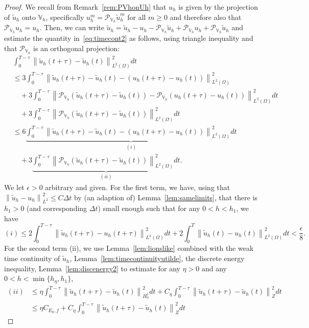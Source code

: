 \documentclass[10pt,letterpaper]{amsart}
\newcommand{\tu}{\widetilde{u}}
\newcommand\norm[1]{\left\lVert#1\right\rVert}
\newcommand{\dom}{\Omega}
\newcommand{\Vh}{\mathbb{V}_h}
\newcommand{\PVh}{\mathcal{P}_{\Vh}}
\theoremstyle{definition}{\newtheorem{definition}[lemma]{Definition}}
\numberwithin{equation}{section}
\begin{document}
\begin{proof}
	We recall from Remark~\ref{rem:PVhonUh} that ${u}_h$ is given by the projection of $\tu_h$ onto $\Vh$, specifically ${u}_h^m = \PVh \tu_h^m$ for all $m\geq 0$ and therefore also that $\PVh u_h = u_h$. Then, we can write $\tu_h = \tu_h-u_h-\PVh \tu_h +\PVh u_h + \PVh \tu_h$ and estimate the quantity in~\eqref{eq:timecont2} as follows, using triangle inequality and that $\PVh$ is an orthogonal projection:
	\begin{align*}
	&\int_0^{T-\tau}\norm{\tu_h(t+\tau)-\tu_h(t)}_{L^2(\dom)}^2 dt\\
	& \leq 3\int_0^{T-\tau}\norm{\tu_h(t+\tau)-\tu_h(t)-(u_h(t+\tau)-u_h(t))}_{L^2(\dom)}^2\\
	&\quad  + 3\int_0^{T-\tau}\norm{\PVh( \tu_h(t+\tau)-\tu_h(t))-\PVh( u_h(t+\tau)-  u_h(t))}_{L^2(\dom)}^2dt \\
	&\quad +3\int_0^{T-\tau}\norm{\PVh( \tu_h(t+\tau)- \tu_h(t))}_{L^2(\dom)}^2 dt\\
	& \leq 6	\underbrace{\int_0^{T-\tau}\norm{\tu_h(t+\tau)-\tu_h(t) - ({u}_h(t+\tau)-{u}_h(t))}_{L^2(\dom)}^2 dt}_{(i)} \\
	&\quad +  3\underbrace{\int_0^{T-\tau}\norm{ \PVh({\tu}_h(t+\tau)- {\tu}_h(t))}_{L^2(\dom)}^2 dt}_{(ii)}.
	\end{align*}
	We let $\epsilon>0$ arbitrary and given. For the first term, we have, using that $\norm{\tu_h-{u}_h}_{L^2}^2\leq C \Delta t$  by (an adaption of) Lemma~\ref{lem:samelimits}, that there is $h_1>0$ (and corresponding $\Delta t $) small enough such that for any $0<h<h_1$, we have
	\begin{equation*}
		(i) \leq 2\int_0^{T-\tau}\norm{\tu_h(t+\tau)  - {u}_h(t+\tau) }_{L^2(\dom)}^2 dt + 2\int_0^{T}\norm{\tu_h(t)-{u}_h(t)}_{L^2(\dom)}^2 dt < \frac{\epsilon}{8}.
	\end{equation*}
	For the second term (ii), we use Lemma~\ref{lem:lionslike}   combined with the weak time continuity of $\tu_h$, Lemma~\ref{lem:timecontinuityutilde}, the discrete energy inequality, Lemma~\ref{lem:discenergy2} to estimate for any $\eta>0$ and any $0<h<\min\{h_\eta,h_1\}$,
	\begin{equation*}
	\begin{split}
			(ii)& \leq \eta \int_0^{T-\tau} \norm{\tu_h(t+\tau)-\tu_h(t)}_{H^1_0}^2 dt + C_\eta \int_0^{T-\tau}\norm{\tu_h(t+\tau)-\tu_h(t)}_Z^2 dt\\
			& \leq \eta C_{E_0,f} + C_\eta \int_0^{T-\tau}\norm{\tu_h(t+\tau)-\tu_h(t)}_Z^2 dt
	\end{split}

\end{equation*}
\end{proof}
\end{document}

